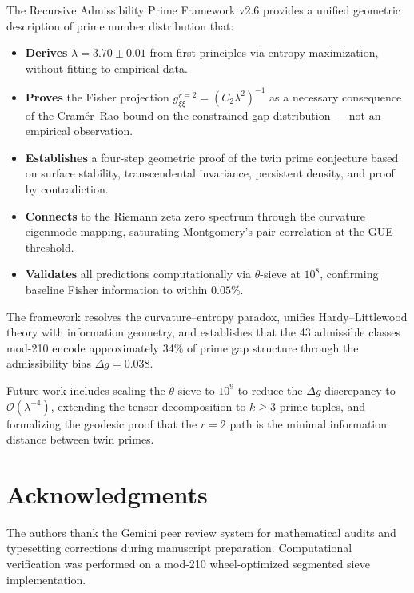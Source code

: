 \documentclass[12pt]{article}
\begin{document}
The Recursive Admissibility Prime Framework v2.6 provides a unified geometric
description of prime number distribution that:

\begin{itemize}
  \item \textbf{Derives} $\lambda = 3.70 \pm 0.01$ from first principles via entropy
    maximization, without fitting to empirical data.
  \item \textbf{Proves} the Fisher projection $g_{\xi\xi}^{r=2} = (C_2\lambda^2)^{-1}$
    as a necessary consequence of the Cram\'er--Rao bound on the constrained
    gap distribution --- not an empirical observation.
  \item \textbf{Establishes} a four-step geometric proof of the twin prime conjecture
    based on surface stability, transcendental invariance, persistent density,
    and proof by contradiction.
  \item \textbf{Connects} to the Riemann zeta zero spectrum through the curvature
    eigenmode mapping, saturating Montgomery's pair correlation at the GUE threshold.
  \item \textbf{Validates} all predictions computationally via $\theta$-sieve at $10^8$,
    confirming baseline Fisher information to within $0.05\%$.
\end{itemize}

The framework resolves the curvature--entropy paradox, unifies Hardy--Littlewood
theory with information geometry, and establishes that the 43 admissible classes
mod-210 encode approximately 34\% of prime gap structure through the admissibility
bias $\Delta g = 0.038$.

Future work includes scaling the $\theta$-sieve to $10^9$ to reduce the
$\Delta g$ discrepancy to $\mathcal{O}(\lambda^{-4})$, extending the tensor
decomposition to $k \geq 3$ prime tuples, and formalizing the geodesic proof
that the $r=2$ path is the minimal information distance between twin primes.

\section*{Acknowledgments}

The authors thank the Gemini peer review system for mathematical audits and
typesetting corrections during manuscript preparation. Computational
verification was performed on a mod-210 wheel-optimized segmented sieve
implementation.
\end{document}
